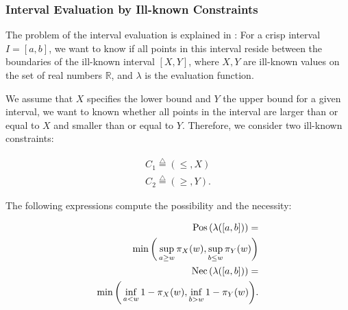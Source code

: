 
\subsubsection{Interval Evaluation by Ill-known Constraints}
The problem of the interval evaluation is explained in \cite{Pon11}: For a crisp interval $I = \left[ a, b \right]$, we want to know if all points in this interval reside between the boundaries of the ill-known interval $\left[ X , Y \right]$, where $X,Y$ are ill-known values on the set of real numbers $\mathbb{R}$, and $\lambda$ is the evaluation function.

We assume that $X$ specifies the lower bound and $Y$ the upper bound for a given interval, we want to known whether all points in the interval are larger than or equal to $X$ and smaller than or equal to $Y$. Therefore, we consider two ill-known constraints:

\begin{eqnarray}
C_1\stackrel{\triangle}{=}\left(\leq,X\right)\\
C_2\stackrel{\triangle}{=}\left(\geq,Y\right).
\end{eqnarray}

The following expressions compute the possibility and the necessity: 

\begin{eqnarray}
\label{eq:interval-pos}
\operatorname{Pos}\left(\lambda([a,b])\right)=\\
\nonumber
\min\bigg(\sup_{a\geq w}\pi_{X}(w),\sup_{b\leq w}\pi_{Y}(w)\bigg)\\
\label{eq:interval-nec}
\operatorname{Nec}\left(\lambda([a,b])\right)=\\
\nonumber
\min\bigg(\inf_{a<w}1-\pi_{X}(w),\inf_{b>w}1-\pi_{Y}(w)\bigg).
\end{eqnarray}

